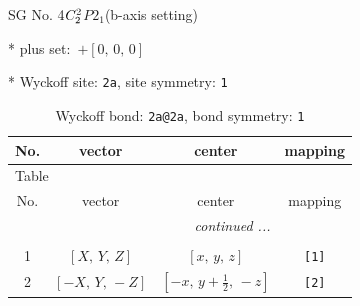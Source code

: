 \documentclass[fleqn,8pt]{jsarticle}
\begin{document}
\setcounter{MaxMatrixCols}{32}

\renewcommand{\tablename}{Table~}
\renewcommand{\figurename}{Figure~}
\begin{center}
\LARGE
SG No. 4\quad$C_{\rm 2}^{2}$\quad$P2_1$\quad(b-axis setting)\quad[ monoclinic ]
\end{center}

* plus set:\,\,\,$+\left[ 0,\, 0,\, 0 \right]$


* Wyckoff site: {\tt 2a}, site symmetry: {\tt 1}
\renewcommand{\arraystretch}{1.2}
\begin{longtable}{cccc}
\caption{Wyckoff bond: {\tt 2a@2a}, bond symmetry: {\tt 1}}
 \\
 \hline \hline
No. & vector & center & mapping \\ \hline \endfirsthead

\multicolumn{3}{l}{\tablename\ \thetable{}} \\
 \hline \hline
No. & vector & center & mapping \\ \hline \endhead

 \hline \hline
\multicolumn{3}{r}{\footnotesize\it continued ...} \\ \endfoot

 \hline \hline
\multicolumn{3}{r}{} \\ \endlastfoot

1 & $\left[ X,\, Y,\, Z \right]$ & $\left[ x,\, y,\, z \right]$ & {\tt [1]} \\ \hline
2 & $\left[ - X,\, Y,\, - Z \right]$ & $\left[ - x,\, y + \frac{1}{2},\, - z \right]$ & {\tt [2]} \\
\end{longtable}
\end{document}
